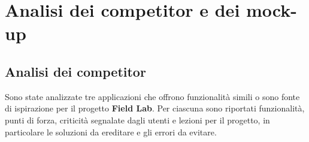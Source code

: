 \clearpage
\section{Analisi dei competitor e dei mock-up}

\subsection{Analisi dei competitor}
Sono state analizzate tre applicazioni che offrono funzionalità simili o sono fonte di ispirazione per il progetto \textbf{Field Lab}. Per ciascuna sono riportati funzionalità, punti di forza, criticità segnalate dagli utenti e lezioni per il progetto, in particolare le soluzioni da ereditare e gli errori da evitare.

\begingroup
{}
